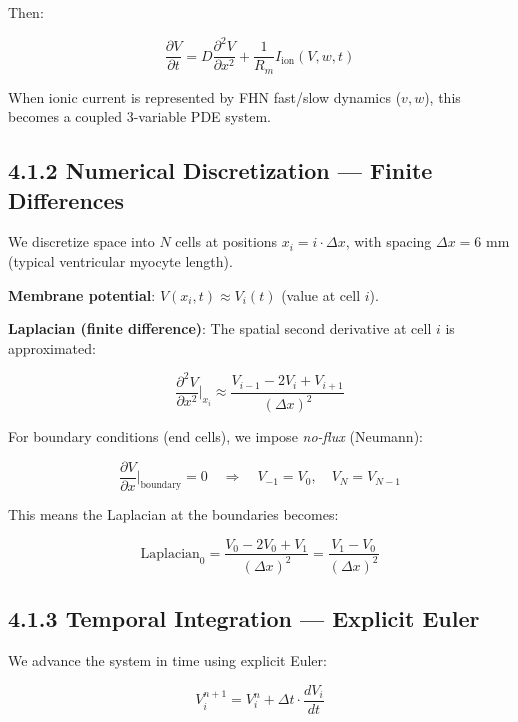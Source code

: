 Then:

\begin{equation}
\frac{\partial V}{\partial t} = D \frac{\partial^2 V}{\partial x^2} + \frac{1}{R_m} I_{\text{ion}}(V, w, t)
\label{eq:monodomain_simplified}
\end{equation}

When ionic current is represented by FHN fast/slow dynamics ($v, w$), this becomes a coupled 3-variable PDE system.

\subsection{4.1.2 Numerical Discretization — Finite Differences}

We discretize space into $N$ cells at positions $x_i = i \cdot \Delta x$, with spacing $\Delta x = 6$ mm (typical ventricular myocyte length).

\textbf{Membrane potential}: $V(x_i, t) \approx V_i(t)$ (value at cell $i$).

\textbf{Laplacian (finite difference)}: The spatial second derivative at cell $i$ is approximated:

\begin{equation}
\frac{\partial^2 V}{\partial x^2}\bigg|_{x_i} \approx \frac{V_{i-1} - 2V_i + V_{i+1}}{(\Delta x)^2}
\label{eq:laplacian_fd}
\end{equation}

For boundary conditions (end cells), we impose \emph{no-flux} (Neumann):

\begin{equation}
\frac{\partial V}{\partial x}\bigg|_{\text{boundary}} = 0 \quad \Rightarrow \quad V_{-1} = V_0, \quad V_N = V_{N-1}
\end{equation}

This means the Laplacian at the boundaries becomes:

\begin{equation}
\text{Laplacian}_0 = \frac{V_0 - 2V_0 + V_1}{(\Delta x)^2} = \frac{V_1 - V_0}{(\Delta x)^2}
\end{equation}

\subsection{4.1.3 Temporal Integration — Explicit Euler}

We advance the system in time using explicit Euler:

\begin{equation}
V_i^{n+1} = V_i^n + \Delta t \cdot \frac{dV_i}{dt}
\end{equation}

